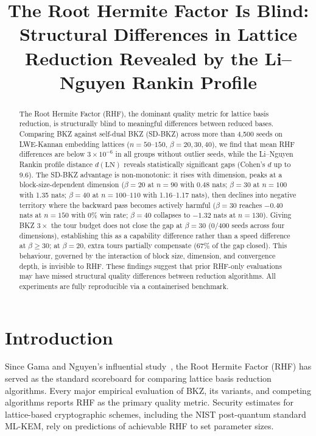 \documentclass[journal=cic,version=preprint]{iacrj}
\title[running={The Root Hermite Factor Is Blind}]{The Root Hermite Factor Is Blind: Structural Differences in Lattice Reduction Revealed by the Li--Nguyen Rankin Profile}
\begin{document}
\maketitle

\begin{abstract}
The Root Hermite Factor (RHF), the dominant quality metric for lattice basis reduction, is structurally blind to meaningful differences between reduced bases. Comparing BKZ against self-dual BKZ (SD-BKZ) across more than 4{,}500 seeds on LWE-Kannan embedding lattices ($n = 50$--$150$, $\beta = 20, 30, 40$), we find that mean RHF differences are below $3\times 10^{-6}$ in all groups without outlier seeds, while the Li--Nguyen Rankin profile distance $d(\mathrm{LN})$ reveals statistically significant gaps (Cohen's $d$ up to 9.6). The SD-BKZ advantage is non-monotonic: it rises with dimension, peaks at a block-size-dependent dimension ($\beta=20$ at $n=90$ with 0.48 nats; $\beta=30$ at $n=100$ with 1.35 nats; $\beta=40$ at $n=100$--$110$ with 1.16--1.17 nats), then declines into negative territory where the backward pass becomes actively harmful ($\beta=30$ reaches $-0.40$ nats at $n=150$ with 0\% win rate; $\beta=40$ collapses to $-1.32$ nats at $n=130$). Giving BKZ $3\times$ the tour budget does not close the gap at $\beta=30$ (0/400 seeds across four dimensions), establishing this as a capability difference rather than a speed difference at $\beta\geq 30$; at $\beta=20$, extra tours partially compensate (67\% of the gap closed). This behaviour, governed by the interaction of block size, dimension, and convergence depth, is invisible to RHF. These findings suggest that prior RHF-only evaluations may have missed structural quality differences between reduction algorithms. All experiments are fully reproducible via a containerised benchmark.
\end{abstract}

\section{Introduction}
\label{sec:intro}

Since Gama and Nguyen's influential study~\cite{EC:GamNgu08}, the Root Hermite Factor (RHF) has served as the standard scoreboard for comparing lattice basis reduction algorithms. Every major empirical evaluation of BKZ, its variants, and competing algorithms reports RHF as the primary quality metric. Security estimates for lattice-based cryptographic schemes, including the NIST post-quantum standard ML-KEM, rely on predictions of achievable RHF to set parameter sizes.
\end{document}
